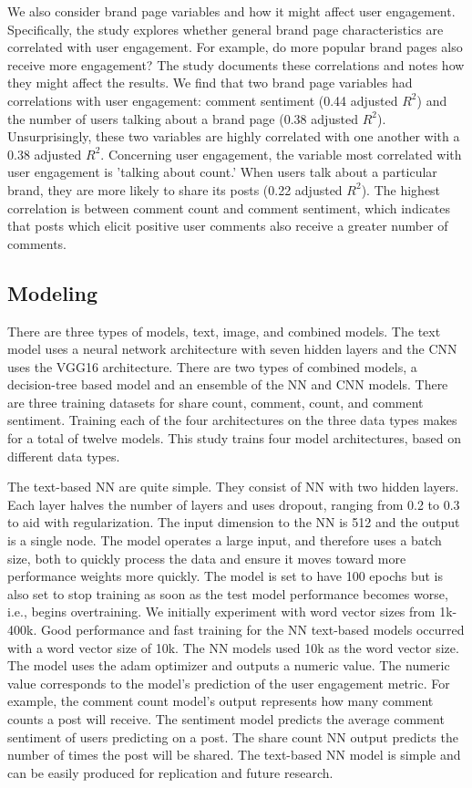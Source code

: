 \documentclass[mksc,blindrev]{informs3} %
\begin{document}
We also consider brand page variables and how it might affect user engagement. Specifically, the study explores whether general brand page characteristics are correlated with user engagement. For example, do more popular brand pages also receive more engagement? The study documents these correlations and notes how they might affect the results. We find that two brand page variables had correlations with user engagement: comment sentiment (0.44 adjusted $R^2$) and the number of users talking about a brand page (0.38 adjusted $R^2$). Unsurprisingly, these two variables are highly correlated with one another with a 0.38 adjusted $R^2$. Concerning user engagement, the variable most correlated with user engagement is ’talking about count.’ When users talk about a particular brand, they are more likely to share its posts (0.22 adjusted $R^2$). The highest correlation is between comment count and comment sentiment, which indicates that posts which elicit positive user comments also receive a greater number of comments. 

\subsection{Modeling}

There are three types of models, text, image, and combined models. The text model uses a neural network architecture with seven hidden layers and the CNN uses the VGG16 architecture. There are two types of combined models, a decision-tree based model and an ensemble of the NN and CNN models. There are three training datasets for share count, comment, count, and comment sentiment. Training each of the four architectures on the three data types makes for a total of twelve models. This study trains four model architectures, based on different data types.

The text-based NN are quite simple. They consist of NN with two hidden layers. Each layer halves the number of layers and uses dropout, ranging from 0.2 to 0.3 to aid with regularization. The input dimension to the NN is 512 and the output is a single node. The model operates a large input, and therefore uses a batch size, both to quickly process the data and ensure it moves toward more performance weights more quickly. The model is set to have 100 epochs but is also set to stop training as soon as the test model performance becomes worse, i.e., begins overtraining. We initially experiment with word vector sizes from 1k-400k. Good performance and fast training for the NN text-based models occurred with a word vector size of 10k. The NN models used 10k as the word vector size. The model uses the adam optimizer and outputs a numeric value. The numeric value corresponds to the model's prediction of the user engagement metric. For example, the comment count model's output represents how many comment counts a post will receive. The sentiment model predicts the average comment sentiment of users predicting on a post. The share count NN output predicts the number of times the post will be shared. The text-based NN model is simple and can be easily produced for replication and future research.
\end{document}
